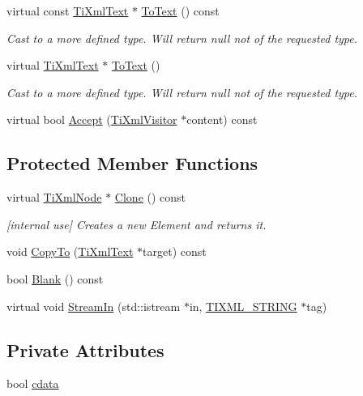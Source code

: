 \begin{DoxyCompactItemize}
virtual const \hyperlink{class_ti_xml_text}{Ti\+Xml\+Text} $\ast$ \hyperlink{class_ti_xml_text_af8973cfd4ca00c5d934cb23e8aa0f5d5}{To\+Text} () const
\begin{DoxyCompactList}\small\item\em Cast to a more defined type. Will return null not of the requested type. \end{DoxyCompactList}\item 
virtual \hyperlink{class_ti_xml_text}{Ti\+Xml\+Text} $\ast$ \hyperlink{class_ti_xml_text_ae7c3a8fd3e4dbf6c0c4363a943d72f5b}{To\+Text} ()
\begin{DoxyCompactList}\small\item\em Cast to a more defined type. Will return null not of the requested type. \end{DoxyCompactList}\item 
virtual bool \hyperlink{class_ti_xml_text_af65964326eac4640bfb97d4622fa0de2}{Accept} (\hyperlink{class_ti_xml_visitor}{Ti\+Xml\+Visitor} $\ast$content) const
\end{DoxyCompactItemize}
\subsection*{Protected Member Functions}
\begin{DoxyCompactItemize}
\item 
virtual \hyperlink{class_ti_xml_node}{Ti\+Xml\+Node} $\ast$ \hyperlink{class_ti_xml_text_a98a20d7a4f1c1478e25e34921be24bfe}{Clone} () const
\begin{DoxyCompactList}\small\item\em \mbox{[}internal use\mbox{]} Creates a new Element and returns it. \end{DoxyCompactList}\item 
void \hyperlink{class_ti_xml_text_a480b8e0ad6b7833a73ecf2191195c9b5}{Copy\+To} (\hyperlink{class_ti_xml_text}{Ti\+Xml\+Text} $\ast$target) const
\item 
bool \hyperlink{class_ti_xml_text_a0fd9005b279def46859b72f336b158da}{Blank} () const
\item 
virtual void \hyperlink{class_ti_xml_text_ab0ad9f14fd41689ced26f21a5c8919b4}{Stream\+In} (std\+::istream $\ast$in, \hyperlink{tinyxml_8h_a92bada05fd84d9a0c9a5bbe53de26887}{T\+I\+X\+M\+L\+\_\+\+S\+T\+R\+I\+NG} $\ast$tag)
\end{DoxyCompactItemize}
\subsection*{Private Attributes}
\begin{DoxyCompactItemize}
\item 
bool \hyperlink{class_ti_xml_text_a1919a0467daf2cf5d099b225add5b9f1}{cdata}
\end{DoxyCompactItemize}
